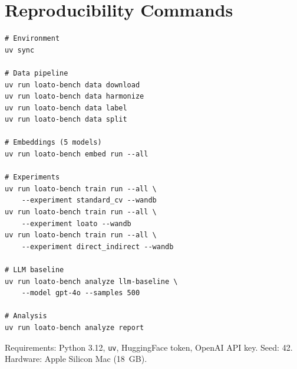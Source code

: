 \documentclass[11pt,a4paper]{article}
\begin{document}
\section{Reproducibility Commands}
\label{app:repro}

\begin{verbatim}
# Environment
uv sync

# Data pipeline
uv run loato-bench data download
uv run loato-bench data harmonize
uv run loato-bench data label
uv run loato-bench data split

# Embeddings (5 models)
uv run loato-bench embed run --all

# Experiments
uv run loato-bench train run --all \
    --experiment standard_cv --wandb
uv run loato-bench train run --all \
    --experiment loato --wandb
uv run loato-bench train run --all \
    --experiment direct_indirect --wandb

# LLM baseline
uv run loato-bench analyze llm-baseline \
    --model gpt-4o --samples 500

# Analysis
uv run loato-bench analyze report
\end{verbatim}

\noindent Requirements: Python 3.12, \texttt{uv}, HuggingFace token, OpenAI API
key. Seed: 42. Hardware: Apple Silicon Mac (18~GB).
\end{document}
